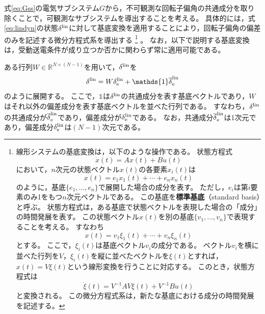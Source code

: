 \documentclass[tombow,dvipdfmx]{corona-a5-1.1}
\begin{document}
式\ref{eq:Gss}の電気サブシステム$G$から，不可観測な回転子偏角の共通成分を取り除くことで，可観測なサブシステムを導出することを考える。
具体的には，式\ref{eq:lindyn}の状態$\delta^{\rm lin}$に対して基底変換を適用することにより，回転子偏角の偏差のみを記述する微分方程式系を導出する
\footnote{
線形システムの基底変換は，以下のような操作である。
状態方程式
\[
\dot{x}(t)=Ax(t)+Bu(t)
\]
において，$n$次元の状態ベクトル$x(t)$の各要素$x_i(t)$は
\[
x(t)
=
e_1 x_1(t) + \cdots + e_n x_n(t)
\]
のように，基底$\{e_1,\ldots,e_n\}$で展開した場合の成分を表す。
ただし，$e_i$は第$i$要素のみ1をもつ$n$次元ベクトルである。
この基底を\textbf{標準基底}（standard basis）と呼ぶ。
状態方程式は，ある基底で状態ベクトルを表現した場合の「成分」の時間発展を表す。
この状態ベクトル$x(t)$を別の基底$\{v_1,\ldots,v_n\}$で表現することを考える。
すなわち
\[
x(t)
=
v_1 \xi_1(t) + \cdots + v_n \xi_n(t)
\]
とする。
ここで，$\xi_i(t)$は基底ベクトル$v_i$の成分である。
ベクトル$v_i$を横に並べた行列を$V$，$\xi_i(t)$を縦に並べたベクトルを$\xi(t)$とすれば，
$x(t)=V\xi(t)$という線形変換を行うことに対応する。
このとき，状態方程式は
\[
\dot{\xi}(t)=V^{-1}AV \xi(t) + V^{-1} Bu(t)
\]
と変換される。
この微分方程式系は，新たな基底における成分の時間発展を記述する。
}
。
なお，以下で説明する基底変換は，受動送電条件が成り立つか否かに関わらず常に適用可能である。

ある行列$W \in \mathbb{R}^{N\times (N-1)}$を用いて，$\delta^{\rm lin}$を
\begin{align}\label{eq:batrinv}
\delta^{\rm lin}
=
W
\delta^{\rm lin}_{\rm e} +
\mathds{1}
\overline{\delta}^{\rm lin}_{\rm e}
\end{align}
のように展開する。
ここで，$\mathds{1}$は$\delta^{\rm lin}$の共通成分を表す基底ベクトルであり，$W$はそれ以外の偏差成分を表す基底ベクトルを並べた行列である。
すなわち，$\delta^{\rm lin}$の共通成分が$\overline{\delta}^{\rm lin}_{\rm e}$であり，偏差成分が$\delta^{\rm lin}_{\rm e}$である。
なお，共通成分$\overline{\delta}^{\rm lin}_{\rm e}$は1次元であり，偏差成分$\delta^{\rm lin}_{\rm e}$は$(N-1)$次元である。
\end{document}
